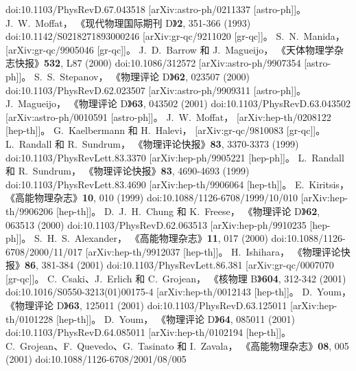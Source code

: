 \documentclass[jkps,preprint,fleqn]{revtex4}
\begin{document}
\begin{CJK*}{UTF8}{gbsn}
\begin{thebibliography}{999}
doi:10.1103/PhysRevD.67.043518  
[arXiv:astro-ph/0211337 [astro-ph]]。  
J.~W.~Moffat，  
《现代物理国际期刊 D》\textbf{2}, 351-366 (1993)  
doi:10.1142/S0218271893000246  
[arXiv:gr-qc/9211020 [gr-qc]]。  
S.~N.~Manida，  
[arXiv:gr-qc/9905046 [gr-qc]]。  
J.~D.~Barrow 和 J.~Magueijo，  
《天体物理学杂志快报》\textbf{532}, L87 (2000)  
doi:10.1086/312572  
[arXiv:astro-ph/9907354 [astro-ph]]。  
S.~S.~Stepanov，  
《物理评论 D》\textbf{62}, 023507 (2000)  
doi:10.1103/PhysRevD.62.023507  
[arXiv:astro-ph/9909311 [astro-ph]]。  
J.~Magueijo，  
《物理评论 D》\textbf{63}, 043502 (2001)  
doi:10.1103/PhysRevD.63.043502  
[arXiv:astro-ph/0010591 [astro-ph]]。  
J.~W.~Moffat，  
[arXiv:hep-th/0208122 [hep-th]]。  
G.~Kaelbermann 和 H.~Halevi，  
[arXiv:gr-qc/9810083 [gr-qc]]。  
L.~Randall 和 R.~Sundrum，  
《物理评论快报》\textbf{83}, 3370-3373 (1999)  
doi:10.1103/PhysRevLett.83.3370  
[arXiv:hep-ph/9905221 [hep-ph]]。  
L.~Randall 和 R.~Sundrum，  
《物理评论快报》\textbf{83}, 4690-4693 (1999)  
doi:10.1103/PhysRevLett.83.4690  
[arXiv:hep-th/9906064 [hep-th]]。  
E.~Kiritsis，  
《高能物理杂志》\textbf{10}, 010 (1999)  
doi:10.1088/1126-6708/1999/10/010  
[arXiv:hep-th/9906206 [hep-th]]。  
D.~J.~H.~Chung 和 K.~Freese，  
《物理评论 D》\textbf{62}, 063513 (2000)  
doi:10.1103/PhysRevD.62.063513  
[arXiv:hep-ph/9910235 [hep-ph]]。  
S.~H.~S.~Alexander，  
《高能物理杂志》\textbf{11}, 017 (2000)  
doi:10.1088/1126-6708/2000/11/017  
[arXiv:hep-th/9912037 [hep-th]]。  
H.~Ishihara，  
《物理评论快报》\textbf{86}, 381-384 (2001)  
doi:10.1103/PhysRevLett.86.381  
[arXiv:gr-qc/0007070 [gr-qc]]。  
C.~Csaki、J.~Erlich 和 C.~Grojean，  
《核物理 B》\textbf{604}, 312-342 (2001)  
doi:10.1016/S0550-3213(01)00175-4  
[arXiv:hep-th/0012143 [hep-th]]。  
D.~Youm，  
《物理评论 D》\textbf{63}, 125011 (2001)  
doi:10.1103/PhysRevD.63.125011  
[arXiv:hep-th/0101228 [hep-th]]。  
D.~Youm，  
《物理评论 D》\textbf{64}, 085011 (2001)  
doi:10.1103/PhysRevD.64.085011  
[arXiv:hep-th/0102194 [hep-th]]。  
C.~Grojean、F.~Quevedo、G.~Tasinato 和 I.~Zavala，  
《高能物理杂志》\textbf{08}, 005 (2001)  
doi:10.1088/1126-6708/2001/08/005  

\end{thebibliography}
\end{CJK*}
\end{document}
